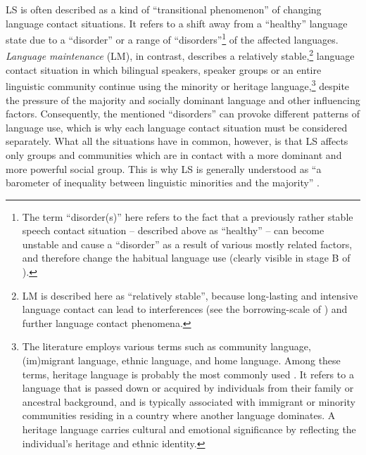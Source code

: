 \documentclass[output=paper]{langscibook}
\begin{document}
LS is often described as a kind of ``transitional phenomenon'' \parencite[33]{Bohm2010} of changing language contact situations. It refers to a shift away from a ``healthy'' language state due to a ``disorder'' or a range of ``disorders''\footnote{The term ``disorder(s)'' here refers to the fact that a previously rather stable speech contact situation -- described above as ``healthy'' -- can become unstable and cause a ``disorder'' as a result of various mostly related factors, and therefore change the habitual language use (clearly visible in stage B of ).} of the affected languages. \emph{Language maintenance} (LM), in contrast, describes a relatively stable,\footnote{LM is described here as ``relatively stable'', because long-lasting and intensive language contact can lead to interferences (see the borrowing-scale of \citealt{thomasonetal1988language}) and further language contact phenomena.} language contact situation in which bilingual speakers, speaker groups or an entire linguistic community continue using the minority or heritage language,\footnote{The literature employs various terms such as community language, (im)migrant language, ethnic language, and home language. Among these terms, heritage language is probably the most commonly used \parencite[23]{Pauwels2016}. It refers to a language that is passed down or acquired by individuals from their family or ancestral background, and is typically associated with immigrant or minority communities residing in a country where another language dominates. A heritage language carries cultural and emotional significance by reflecting the individual's heritage and ethnic identity.} despite the pressure of the majority and socially dominant language and other influencing factors. Consequently, the mentioned ``disorders'' can provoke different patterns of language use, which is why each language contact situation must be considered separately. What all the situations have in common, however, is that LS affects only groups and communities which are in contact with a more dominant and more powerful social group. This is why LS is generally understood as ``a barometer of inequality between linguistic minorities and the majority'' \parencite[613]{Heinrich2015}.
\end{document}
